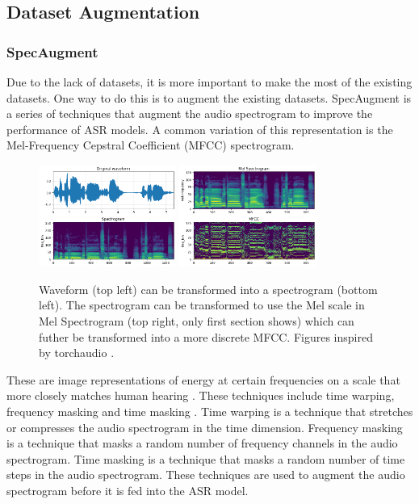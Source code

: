 \documentclass[letterpaper, 12pt]{article}
\begin{document}
\begin{multicols*}{2}
\subsection{Dataset Augmentation}
\subsubsection{SpecAugment}
Due to the lack of datasets, it is more important to make the most of the existing datasets. One
way to do this is to augment the existing datasets. SpecAugment is a series of techniques that
augment the audio spectrogram to improve the performance of ASR models. A common variation of this
representation is the Mel-Frequency Cepstral Coefficient (MFCC) spectrogram.

\begin{figure}
    \centering
    \includegraphics[width=0.4\textwidth]{assets/waveform-to-spectrogram-sing.png}
    \includegraphics[width=0.4\textwidth]{assets/melspectrogram-mfcc.png}
    \caption{Waveform (top left) can be transformed into a spectrogram (bottom left).
    The spectrogram can be transformed to use the Mel scale in Mel Spectrogram (top right,
    only first section shows) which can futher be transformed into a more discrete MFCC.
    Figures inspired by torchaudio \citep{torchAudioFigures}.}
    \label{fig:MFCC}
\end{figure}

These are image representations of
energy at certain frequencies on a scale that more closely matches human hearing \citep{MFCC}.
These techniques include time warping, frequency masking and time masking \citep{SpecAugment}.
Time warping is a technique that stretches or compresses the audio spectrogram in the time
dimension. Frequency masking is a technique that masks a random number of frequency channels in
the audio spectrogram. Time masking is a technique that masks a random number of time steps
in the audio spectrogram. These techniques are used to augment the audio spectrogram before it
is fed into the ASR model. \citep{SpecAugment}


\end{multicols*}
\end{document}
